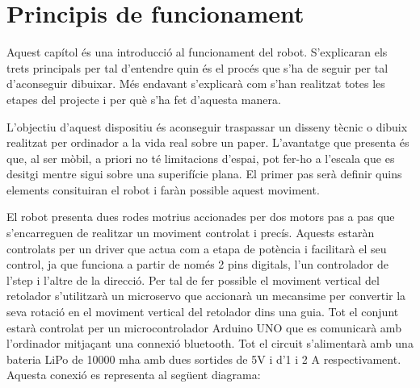 \setlength\topmargin{8mm}
\onehalfspacing
\chapter{Principis de funcionament} %

\label{Chapter2} %






Aquest capítol és una introducció al funcionament del robot. S'explicaran els trets principals per tal d'entendre quin és el procés que s'ha de seguir per tal d'aconseguir dibuixar. Més endavant s'explicarà com s'han realitzat totes les etapes del projecte i per què s'ha fet d'aquesta manera. 

L'objectiu d'aquest dispositiu és aconseguir traspassar un disseny tècnic o dibuix realitzat per ordinador a la vida real sobre un paper. L'avantatge que presenta és que, al ser mòbil, a priori no té limitacions d'espai, pot fer-ho a l'escala que es desitgi mentre sigui sobre una superifície plana. El primer pas serà definir quins elements consituiran el robot i faràn possible aquest moviment. 

El robot presenta dues rodes motrius accionades per dos motors pas a pas que s'encarreguen de realitzar un moviment controlat i precís. Aquests estaràn controlats per un driver que actua com a etapa de potència i facilitarà el seu control, ja que funciona a partir de només 2 pins digitals, l'un controlador de l'step i l'altre de la direcció. Per tal de fer possible el moviment vertical del retolador s'utilitzarà un microservo que accionarà un mecansime per convertir la seva rotació en el moviment vertical del retolador dins una guia. Tot el conjunt estarà controlat per un microcontrolador Arduino UNO que es comunicarà amb l'ordinador mitjaçant una connexió bluetooth. Tot el circuit s'alimentarà amb una bateria LiPo de 10000 mha amb dues sortides de 5V i d'1 i 2 A respectivament. Aquesta conexió es representa al següent diagrama:

